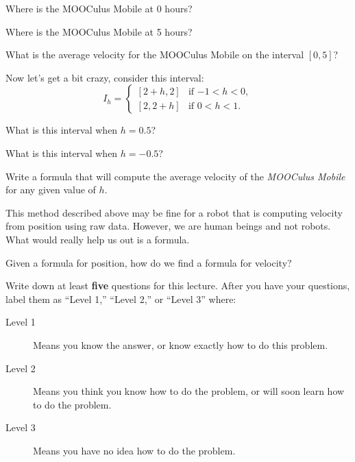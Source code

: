 \documentclass{ximera}
\begin{document}
\begin{question}
Where is the MOOCulus Mobile at 0 hours? 
\end{question}


\begin{question}
Where is the MOOCulus Mobile at 5 hours? 
\end{question}

\begin{question}
What is the average velocity for the MOOCulus Mobile on the interval
$[0,5]$?
\end{question}

Now let's get a bit crazy, consider this interval:
\[
I_h = 
\begin{cases}
[2+h,2]  & \text{if $-1<h<0$}, \\ %
[2,2+h]  & \text{if $0<h<1$}. 
\end{cases}
\]

\begin{question}
What is this interval when $h = 0.5$?
\end{question}

\begin{question}
What is this interval when $h = -0.5$?
\end{question}

\begin{question}
Write a formula that will compute the average velocity of the
\textit{MOOCulus Mobile} for any given value of $h$.
\end{question}

This method described above may be fine for a robot that is computing
velocity from position using raw data. However, we are human beings
and not robots. What would really help us out is a formula. 



\begin{question}
Given a formula for position, how do we find a formula for velocity?
\end{question}

\begin{xarmaBoost}
Write down at least \textbf{five} questions for this lecture. After
you have your questions, label them as ``Level 1,'' ``Level 2,'' or ``Level 3'' where:
\begin{description}
\item[Level 1] Means you know the answer, or know exactly how to do
  this problem.
\item[Level 2] Means you think you know how to do the problem, or will
  soon learn how to do the problem.
\item[Level 3] Means you have no idea how to do the problem.
\end{description}
  \begin{freeResponse}
  \end{freeResponse}
\end{xarmaBoost}
\end{document}
